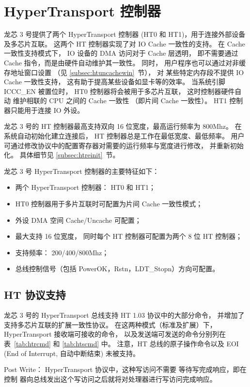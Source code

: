 \chapter{HyperTransport 控制器}

龙芯 3 号提供了两个 HyperTransport 控制器 (HT0 和 HT1)，用于连接外部设备及多芯片互联。
这两个 HT 控制器实现了对 IO Cache 一致性的支持。 在 Cache 一致性支持模式下， IO
设备的 DMA 访问对于 Cache 层透明， 即不需要通过 Cache 指令，而是由硬件自动维护其一致性。
同时， 用户程序也可以通过对非缓存地址窗口设置 （见 \ref{subsec:htuncachewin}~节）， 对
某些特定内存段不提供 IO Cache 一致性支持， 这有助于提高某些设备如显卡等的效率。
当系统引脚 ICCC\_EN 被置位时， HT0 控制器将会被用于多芯片互联， 这时控制器硬件自动
维护相联的 CPU 之间的 Cache 一致性 （即片间 Cache 一致性）。 HT1 控制器只能用于连接
IO 外设。 

龙芯 3 号的 HT 控制器最高支持双向 16 位宽度，最高运行频率为 800Mhz。
在系统自动初始化建立连接后， HT 控制器总是工作在最低宽度、最低频率。
用户可通过修改协议中的配置寄存器对需要的运行频率与宽度进行修改， 并重新初始化。 具体细节见
\ref{subsec:htreinit}~节。

龙芯 3 号 HyperTransport 控制器的主要特征如下：
\begin{itemize}
  \item 两个 HyperTransport 控制器： HT0 和 HT1；
  \item HT0 控制器用于多片互联时可配置为片间 Cache 一致性模式；
  \item 外设 DMA 空间 Cache/Uncache 可配置；
  \item 最大支持 16 位宽度， 同时每个 HT 控制器可配置为两个 8 位 HT 控制器；
  \item 支持频率： 200/400/800Mhz；
  \item 总线控制信号（包括 PowerOK，Rstn，LDT\_Stopn）方向可配置。
\end{itemize}

\section{HT 协议支持}

龙芯 3 号的 HyperTransport 总线支持 HT 1.03 协议中的大部分命令，
并增加了支持多芯片互联的扩展一致性协议。 在这两种模式（标准及扩展）下，HyperTransport
接收端可接收的命令， 以及发送端可发送的命令分别列在表~\ref{tab:htrcmd} 和
\ref{tab:htscmd} 中。 注意，HT 总线的原子操作命令以及 EOI (End of Interrupt, 自动中断结束)
未被支持。

Post Write： HyperTransport 协议中，这种写访问不需要 等待写完成响应，即在控制
器向总线发出这个写访问之后就将对处理器进行写访问完成响应。 


